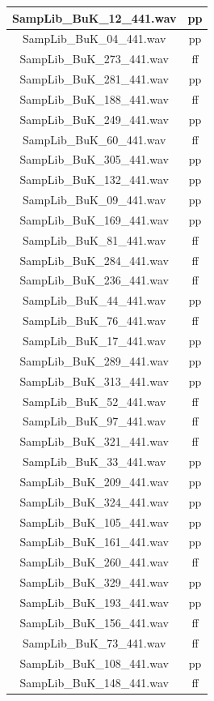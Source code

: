 \begin{table}[H]
\begin{minipage}[b]{0.4\textwidth}
\begin{tabular}{ | c | c | }
    SampLib\_BuK\_12\_441.wav & pp \\
    \hline
    SampLib\_BuK\_04\_441.wav & pp \\
    \hline
    SampLib\_BuK\_273\_441.wav & ff \\
    \hline
    SampLib\_BuK\_281\_441.wav & pp \\
    \hline
    SampLib\_BuK\_188\_441.wav & ff \\
    \hline
    SampLib\_BuK\_249\_441.wav & pp \\
    \hline
    SampLib\_BuK\_60\_441.wav & ff \\
    \hline
    SampLib\_BuK\_305\_441.wav & pp \\
    \hline
    SampLib\_BuK\_132\_441.wav & pp \\
    \hline
    SampLib\_BuK\_09\_441.wav & pp \\
    \hline
    SampLib\_BuK\_169\_441.wav & pp \\
    \hline
    SampLib\_BuK\_81\_441.wav & ff \\
    \hline
    SampLib\_BuK\_284\_441.wav & ff \\
    \hline
    SampLib\_BuK\_236\_441.wav & ff \\
    \hline
    SampLib\_BuK\_44\_441.wav & pp \\
    \hline
    SampLib\_BuK\_76\_441.wav & ff \\
    \hline
    SampLib\_BuK\_17\_441.wav & pp \\
    \hline
    SampLib\_BuK\_289\_441.wav & pp \\
    \hline
    SampLib\_BuK\_313\_441.wav & pp \\
    \hline
    SampLib\_BuK\_52\_441.wav & ff \\
    \hline
    SampLib\_BuK\_97\_441.wav & ff \\
    \hline
    SampLib\_BuK\_321\_441.wav & ff \\
    \hline
    SampLib\_BuK\_33\_441.wav & pp \\
    \hline
    SampLib\_BuK\_209\_441.wav & pp \\
    \hline
    SampLib\_BuK\_324\_441.wav & pp \\
    \hline
    SampLib\_BuK\_105\_441.wav & pp \\
    \hline
    SampLib\_BuK\_161\_441.wav & pp \\
    \hline
    SampLib\_BuK\_260\_441.wav & ff \\
    \hline
    SampLib\_BuK\_329\_441.wav & pp \\
    \hline
    SampLib\_BuK\_193\_441.wav & pp \\
    \hline
    SampLib\_BuK\_156\_441.wav & ff \\
    \hline
    SampLib\_BuK\_73\_441.wav & ff \\
    \hline
    SampLib\_BuK\_108\_441.wav & pp \\
    \hline
    SampLib\_BuK\_148\_441.wav & ff \\
    \hline
    \end{tabular}
  \end{minipage}

\hfill
\end{table}



